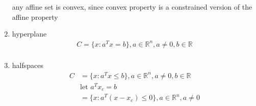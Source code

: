 \documentclass[12pt,letter]{article}
\newcommand{\R}{\mathbb{R}}
\begin{document}
\begin{enumerate}
  any affine set is convex, since convex property is a constrained version of the affine property\\
\item hyperplane
  \begin{align*}
    C=\{x: a^Tx=b\}, a \in \R^n, a \neq 0, b \in \R\\
  \end{align*}
\item halfspaces
  \begin{align*}
    C&=\{x: a^Tx \leq b\}, a \in \R^n, a \neq 0, b \in \R\\
     &\text{let } a^Tx_c=b\\
     &=\{x: a^T(x-x_c) \leq 0\}, a \in \R^n, a \neq 0
    \end{align*}
\end{enumerate}
\end{document}
